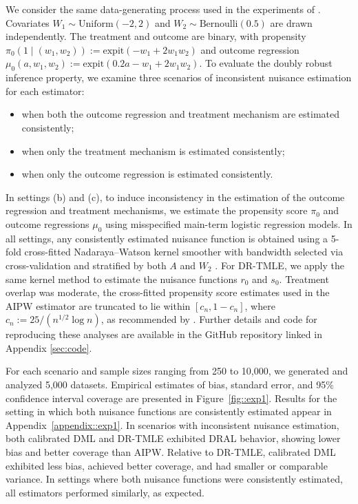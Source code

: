 \documentclass[11pt]{article}
\theoremstyle{plain}
\begin{document}
We consider the same data-generating process used in the experiments of \cite{benkeser2017doubly}. Covariates \( W_1 \sim \text{Uniform}(-2, 2) \) and \( W_2 \sim \text{Bernoulli}(0.5) \) are drawn independently. The treatment and outcome are binary, with propensity \( \pi_0(1 \mid (w_1, w_2)) := \text{expit}(-w_1 + 2w_1 w_2) \) and outcome regression \( \mu_0(a, w_1, w_2) := \text{expit}(0.2a - w_1 + 2w_1 w_2) \). To evaluate the doubly robust inference property, we examine three scenarios of inconsistent nuisance estimation for each estimator:
\begin{itemize}
\item[(a)] when both the outcome regression and treatment mechanism are estimated consistently;\vspace{-.15in}
\item[(b)] when only the treatment mechanism is estimated consistently;\vspace{-.15in}
\item[(c)] when only the outcome regression is estimated consistently.
\end{itemize}
In settings (b) and (c), to induce inconsistency in the estimation of the outcome regression and treatment mechanisms, we estimate the propensity score \( \pi_0 \) and outcome regressions \( \mu_0 \) using misspecified main-term logistic regression models. In all settings, any consistently estimated nuisance function is obtained using a 5-fold cross-fitted Nadaraya–Watson kernel smoother with bandwidth selected via cross-validation and stratified by both \( A \) and \( W_2 \)  \citep{hofmeyr2020fast}. For DR-TMLE, we apply the same kernel method to estimate the nuisance functions \( r_0 \) and \( s_0 \). {\color{purple} Treatment overlap was moderate, the cross-fitted propensity score estimates used in the AIPW estimator are truncated to lie within \( [c_n, 1 - c_n] \), where \( c_n := 25/(n^{1/2} \log n) \), as recommended by \cite{gruber2022data}.} Further details and code for reproducing these analyses are available in the GitHub repository linked in Appendix \ref{sec:code}.



For each scenario and sample sizes ranging from 250 to 10{,}000, we generated and analyzed 5{,}000 datasets. Empirical estimates of bias, standard error, and 95\% confidence interval coverage are presented in Figure~\ref{fig::exp1}. Results for the setting in which both nuisance functions are consistently estimated appear in Appendix~\ref{appendix::exp1}. In scenarios with inconsistent nuisance estimation, both calibrated DML and DR-TMLE exhibited DRAL behavior, showing lower bias and better coverage than AIPW. Relative to DR-TMLE, calibrated DML exhibited less bias, achieved better coverage, and had smaller or comparable variance. In settings where both nuisance functions were consistently estimated, all estimators performed similarly, as expected. 
\end{document}

